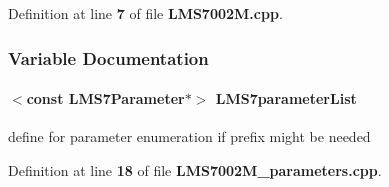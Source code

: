 Definition at line {\bf 7} of file {\bf L\+M\+S7002\+M.\+cpp}.



\subsubsection{Variable Documentation}
\paragraph[{L\+M\+S7parameter\+List}]{$<$const {\bf L\+M\+S7\+Parameter}$\ast$$>$ L\+M\+S7parameter\+List}\label{LMS7002M_8cpp_ab91c6577cf64919b80427f6e7e0cee04}


define for parameter enumeration if prefix might be needed 



Definition at line {\bf 18} of file {\bf L\+M\+S7002\+M\+\_\+parameters.\+cpp}.

